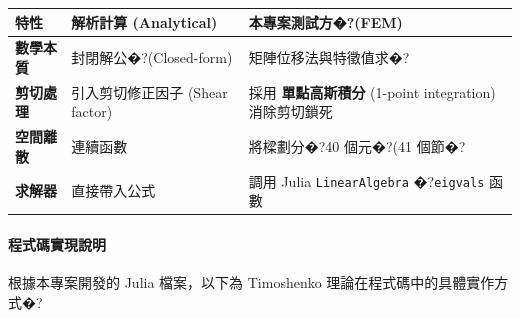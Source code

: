 \documentclass[UTF8, a4paper, 12pt]{ctexart}
\begin{document}
\begin{center}

\begin{tabular}{p{3cm}p{6cm}p{6cm}}

\toprule

\textbf{特性} & \textbf{解析計算 (Analytical)} & \textbf{本專案測試方�?(FEM)} \\

\midrule

\textbf{數學本質} & 封閉解公�?(Closed-form) & 矩陣位移法與特徵值求�?\\

\midrule

\textbf{剪切處理} & 引入剪切修正因子 (Shear factor) & 採用 \textbf{單點高斯積分} (1-point integration) 消除剪切鎖死 \\

\midrule

\textbf{空間離散} & 連續函數 & 將樑劃分�?40 個元�?(41 個節�? \\

\midrule

\textbf{求解器} & 直接帶入公式 & 調用 Julia \texttt{LinearAlgebra} �?\texttt{eigvals} 函數 \\

\bottomrule

\end{tabular}

\end{center}



\paragraph{程式碼實現說明}

根據本專案開發的 Julia 檔案，以下為 Timoshenko 理論在程式碼中的具體實作方式�?
\end{document}
